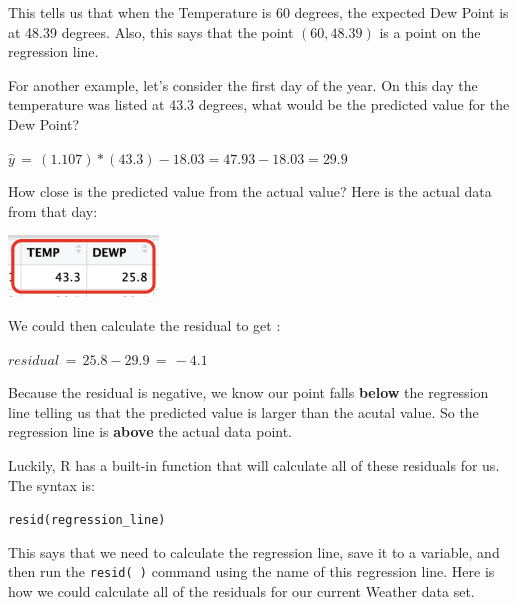 \documentclass[
  letterpaper,
  DIV=11,
  numbers=noendperiod]{scrreprt}
\newenvironment{Shaded}{\begin{snugshade}}{\end{snugshade}}
\newcommand{\CommentTok}[1]{\textcolor[rgb]{0.37,0.37,0.37}{#1}}
\newcommand{\DecValTok}[1]{\textcolor[rgb]{0.68,0.00,0.00}{#1}}
\newcommand{\FunctionTok}[1]{\textcolor[rgb]{0.28,0.35,0.67}{#1}}
\newcommand{\NormalTok}[1]{\textcolor[rgb]{0.00,0.23,0.31}{#1}}
\newcommand{\OtherTok}[1]{\textcolor[rgb]{0.00,0.23,0.31}{#1}}
\newcommand{\SpecialCharTok}[1]{\textcolor[rgb]{0.37,0.37,0.37}{#1}}
\begin{document}
This tells us that when the Temperature is 60 degrees, the expected Dew
Point is at 48.39 degrees. Also, this says that the point
\((60, 48.39)\) is a point on the regression line.

For another example, let's consider the first day of the year. On this
day the temperature was listed at 43.3 degrees, what would be the
predicted value for the Dew Point?

\(\hat{y} \, = \, (1.107)*(43.3) - 18.03 = 47.93 - 18.03 = 29.9\)

How close is the predicted value from the actual value? Here is the
actual data from that day:

\includegraphics[width=0.3\textwidth,height=\textheight]{./images/ROP_8.jpg}

We could then calculate the residual to get :

\(residual \, = \, 25.8 - 29.9\, = \, -4.1\)

Because the residual is negative, we know our point falls \textbf{below}
the regression line telling us that the predicted value is larger than
the acutal value. So the regression line is \textbf{above} the actual
data point.

Luckily, R has a built-in function that will calculate all of these
residuals for us. The syntax is:

\texttt{resid(regression\_line)}

This says that we need to calculate the regression line, save it to a
variable, and then run the \texttt{resid(\ )} command using the name of
this regression line. Here is how we could calculate all of the
residuals for our current Weather data set.

\begin{Shaded}
\end{Shaded}
\end{document}
